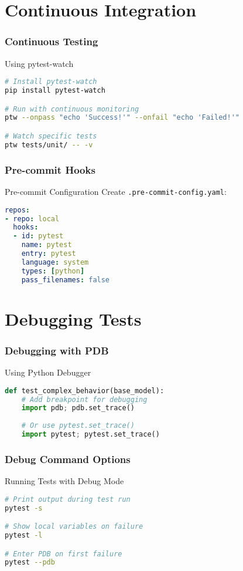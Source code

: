 \documentclass{beamer}
\begin{document}
\section{Continuous Integration}
\begin{frame}[fragile]
    \frametitle{Continuous Testing}
    \begin{block}{Using pytest-watch}
        \begin{lstlisting}[language=bash]
# Install pytest-watch
pip install pytest-watch

# Run with continuous monitoring
ptw --onpass "echo 'Success!'" --onfail "echo 'Failed!'"

# Watch specific tests
ptw tests/unit/ -- -v
        \end{lstlisting}
    \end{block}
\end{frame}

\begin{frame}[fragile]
    \frametitle{Pre-commit Hooks}
    \begin{alertblock}{Pre-commit Configuration}
        Create \texttt{.pre-commit-config.yaml}:
        \begin{lstlisting}[language=yaml]
repos:
- repo: local
  hooks:
  - id: pytest
    name: pytest
    entry: pytest
    language: system
    types: [python]
    pass_filenames: false
        \end{lstlisting}
    \end{alertblock}
\end{frame}

\section{Debugging Tests}
\begin{frame}[fragile]
    \frametitle{Debugging with PDB}
    \begin{block}{Using Python Debugger}
        \begin{lstlisting}[language=Python]
def test_complex_behavior(base_model):
    # Add breakpoint for debugging
    import pdb; pdb.set_trace()
    
    # Or use pytest.set_trace()
    import pytest; pytest.set_trace()
        \end{lstlisting}
    \end{block}
\end{frame}

\begin{frame}[fragile]
    \frametitle{Debug Command Options}
    \begin{alertblock}{Running Tests with Debug Mode}
        \begin{lstlisting}[language=bash]
# Print output during test run
pytest -s

# Show local variables on failure
pytest -l

# Enter PDB on first failure
pytest --pdb
        \end{lstlisting}
    \end{alertblock}
\end{frame}
\end{document}
